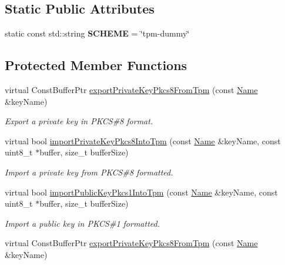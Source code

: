 \subsection*{Static Public Attributes}
\begin{DoxyCompactItemize}
\item 
static const std\+::string {\bfseries S\+C\+H\+E\+ME} = \char`\"{}tpm-\/dummy\char`\"{}\hypertarget{classndn_1_1security_1_1DummyTpm_a6c6de12079c86ded5acca75db121909b}{}\label{classndn_1_1security_1_1DummyTpm_a6c6de12079c86ded5acca75db121909b}

\end{DoxyCompactItemize}
\subsection*{Protected Member Functions}
\begin{DoxyCompactItemize}
\item 
virtual Const\+Buffer\+Ptr \hyperlink{classndn_1_1security_1_1DummyTpm_a710264ef3376a599b659da0a6c120d22}{export\+Private\+Key\+Pkcs8\+From\+Tpm} (const \hyperlink{classndn_1_1Name}{Name} \&key\+Name)
\begin{DoxyCompactList}\small\item\em Export a private key in P\+K\+CS\#8 format. \end{DoxyCompactList}\item 
virtual bool \hyperlink{classndn_1_1security_1_1DummyTpm_a1358171c0e32ccf5e2fc4c8cb97b220e}{import\+Private\+Key\+Pkcs8\+Into\+Tpm} (const \hyperlink{classndn_1_1Name}{Name} \&key\+Name, const uint8\+\_\+t $\ast$buffer, size\+\_\+t buffer\+Size)
\begin{DoxyCompactList}\small\item\em Import a private key from P\+K\+CS\#8 formatted. \end{DoxyCompactList}\item 
virtual bool \hyperlink{classndn_1_1security_1_1DummyTpm_ae17ba60680b0b1eb874e951748d8577f}{import\+Public\+Key\+Pkcs1\+Into\+Tpm} (const \hyperlink{classndn_1_1Name}{Name} \&key\+Name, const uint8\+\_\+t $\ast$buffer, size\+\_\+t buffer\+Size)
\begin{DoxyCompactList}\small\item\em Import a public key in P\+K\+CS\#1 formatted. \end{DoxyCompactList}\item 
virtual Const\+Buffer\+Ptr \hyperlink{classndn_1_1security_1_1DummyTpm_a3fc40bd84a5e562eca186c563b0db492}{export\+Private\+Key\+Pkcs8\+From\+Tpm} (const \hyperlink{classndn_1_1Name}{Name} \&key\+Name)

\end{DoxyCompactItemize}
